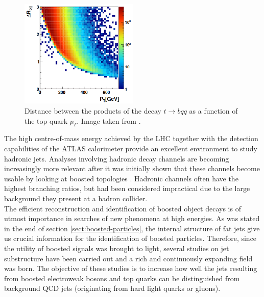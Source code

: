 \documentclass[main]{subfiles} %
\begin{document}
\begin{figure}[h]
    \centering
    \includegraphics[width=0.5\textwidth]{../Figures/Theory/DeltaR_top_decay.png}
    \caption{Distance between the products of the decay $t \to bqq$ as a function of the top quark $p_T$.  Image taken from \cite{Plehn2010}.}
    \label{fig:DeltaR_top_decay}
\end{figure}

\pagebreak

\label{sect:substructure}
\vspace{20pt}

The high centre-of-mass energy achieved by the LHC together with the detection capabilities of the ATLAS calorimeter provide an excellent environment to study hadronic jets. Analyses involving hadronic decay channels are becoming increasingly more relevant after it was initially shown that these channels become usable by looking at boosted topologies \cite{Butterworth2008}. Hadronic channels often have the highest branching ratios, but had been considered impractical due to the large background they present at a hadron collider.\\

The efficient reconstruction and identification of boosted object decays is of utmost importance in searches of new phenomena at high energies. As was stated in the end of section \ref{sect:boosted-particles}, the internal structure of fat jets give us crucial information for the identification of boosted particles. Therefore, since the utility of boosted signals was brought to light, several studies on jet substructure have been carried out \cite{Behr2014} and a rich and continuously expanding field was born. The objective of these studies is to increase how well the jets resulting from boosted electroweak bosons and top quarks can be distinguished from background QCD jets (originating from hard light quarks or gluons).\\
\end{document}
